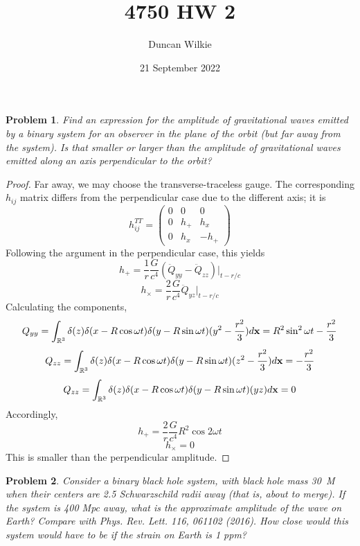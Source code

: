 \documentclass{article}
\title{4750 HW 2}
\author{Duncan Wilkie}
\date{21 September 2022}
\newtheorem{prob}{Problem}
\begin{document}
\maketitle

\begin{prob}
  Find an expression for the amplitude of gravitational waves emitted by a binary system for an observer in the plane of the orbit
  (but far away from the system).
  Is that smaller or larger than the amplitude of gravitational waves emitted along an axis perpendicular to the orbit?
\end{prob}

\begin{proof}
  Far away, we may choose the transverse-traceless gauge.
  The corresponding $h_{ij}$ matrix differs from the perpendicular case due to the different axis; it is
  \[
    h_{ij}^{TT} =
    \begin{pmatrix}
      0 & 0 & 0 \\
      0 & h_{+} & h_{x} \\
      0 & h_{x} & -h_{+}
    \end{pmatrix}
  \]
  Following the argument in the perpendicular case, this yields
  \[
    h_{+} = \frac{1}{r}\frac{G}{c^{4}}(\ddot{Q}_{yy} - \ddot{Q}_{zz})\bigg|_{t - r/c}
  \]
  \[
    h_{\times} = \frac{2}{r}\frac{G}{c^{4}}\ddot{Q}_{yz}\bigg|_{t - r/c}
  \]
  Calculating the components,
  \[
    Q_{yy} = \int_{\mathbb{R}^{3}}\delta(z)\delta(x - R\cos\omega t)\delta(y - R\sin\omega t)(y^{2}-\frac{r^{2}}{3})d\vb{x}
    = R^{2}\sin^{2}\omega t - \frac{r^{2}}{3}
  \]
  \[
    Q_{zz} = \int_{\mathbb{R}^{3}}\delta(z)\delta(x - R\cos\omega t)\delta(y - R\sin\omega t)(z^{2}-\frac{r^{2}}{3})d\vb{x}
    = -\frac{r^{2}}{3}
  \]
  \[
    Q_{zz} = \int_{\mathbb{R}^{3}}\delta(z)\delta(x - R\cos\omega t)\delta(y - R\sin\omega t)(yz)d\vb{x}
    = 0
  \]
  Accordingly,
  \[
    h_{+} = \frac{2}{r}\frac{G}{c^{4}}R^{2}\cos 2\omega t
  \]
  \[
    h_{\times} = 0
  \]
  This is smaller than the perpendicular amplitude.
\end{proof}

\begin{prob}
  Consider a binary black hole system, with black hole mass \SI{30}{M_{\odot}} when their centers are 2.5 Schwarzschild radii away (that is, about to merge).
  If the system is 400 Mpc away, what is the approximate amplitude of the wave on Earth?
  Compare with Phys. Rev. Lett. 116, 061102 (2016).
  How close would this system would have to be if the strain on Earth is 1 ppm?
\end{prob}
\end{document}
